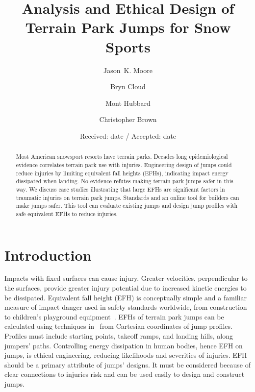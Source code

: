 \documentclass[smallextended]{svjour3}       %
\begin{document}
\title{Analysis and Ethical Design of Terrain Park Jumps for Snow Sports}

\author{
  Jason~K. Moore \and
  Bryn Cloud \and
  Mont Hubbard \and
  Christopher Brown
}


\date{Received: date / Accepted: date}

\maketitle

\begin{abstract}
  Most American snowsport resorts have terrain parks. Decades long
  epidemiological evidence correlates terrain park use with injuries.
  Engineering design of jumps could reduce injuries by limiting equivalent fall
  heights (EFHs), indicating impact energy dissipated when landing. No evidence
  refutes  making terrain park jumps safer in this way. We discuss case studies
  illustrating that large EFHs are significant factors in traumatic injuries on
  terrain park jumps. Standards and an online tool for builders can make jumps
  safer. This tool can evaluate existing jumps and design jump profiles with
  safe equivalent EFHs to reduce injuries.
\end{abstract}

\section{Introduction}
\label{intro}
%
Impacts with fixed surfaces can  cause injury. Greater velocities,
perpendicular to the surfaces, provide greater injury potential due to
increased kinetic energies to be dissipated. Equivalent fall height (EFH) is
conceptually simple and a familiar measure of impact danger used in safety
standards worldwide, from construction~\cite{OSHA2021} to children's playground
equipment~\cite{Chalmers1996}. EFHs of terrain park jumps can be calculated
using techniques in~\cite{McNeil2012} from Cartesian coordinates of jump
profiles. Profiles must include starting points, takeoff ramps, and landing
hills, along jumpers' paths. Controlling energy dissipation in human bodies,
hence EFH on jumps, is ethical engineering, reducing likelihoods and severities
of injuries. EFH should be a primary attribute of jumps' designs. It must be
considered because of clear connections to injuries risk and  can be used
easily to design and construct jumps.
\end{document}
